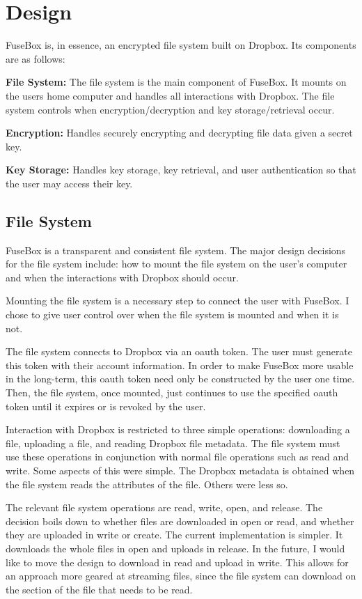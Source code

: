 \documentclass[11pt,twocolumn,letterpaper]{article}
\newcommand{\appname}{FuseBox }
\newcommand{\appnameWOspace}{FuseBox}
\begin{document}
\section{Design}
\label{sec:design}
\appname is, in essence, an encrypted file system built on
Dropbox. Its components are as follows:
\par {\bf File System:} The file system is the main component of 
\appnameWOspace. It mounts on the users home computer and handles 
all interactions with Dropbox. The file system controls when
encryption/decryption and key storage/retrieval occur.   
\par {\bf Encryption:} Handles securely encrypting and decrypting file data
given a secret key. 
\par {\bf Key Storage:} Handles key storage, key retrieval, and user
authentication so that the user may access their key. 

\subsection{File System}
\label{sec:fs}
\appname is a transparent and consistent file system. The major design
decisions for the file system include: how to mount the file system on
the user's computer and when the interactions with Dropbox should
occur. 
\par Mounting the file system is a necessary step to connect the user
with \appnameWOspace. I chose to give user control over when the file
system is mounted and when it is not.  
\par The file system connects to Dropbox via an oauth token. The user must
generate this token with their account information. In order to make
\appname more usable in the long-term, this oauth token need only be
constructed by the user one time. Then, the file system, once mounted,
just continues to use the specified oauth token until it expires or is
revoked by the user. 
\par Interaction with Dropbox is restricted to three simple
operations: downloading a file, uploading a file, and reading Dropbox
file metadata. The file system must use these operations in
conjunction with normal file operations such as read and write. Some
aspects of this were simple. The Dropbox metadata is obtained when the
file system reads the attributes of the file. Others were less so.
\par The relevant file system operations are read, write, open, and
release. The decision boils down to whether files are downloaded in
open or read, and whether they are uploaded in write or create. The
current implementation is simpler. It downloads the whole files in open and uploads in
release. In the future, I would like to move the design to download in
read and upload in write. This allows for an approach more geared at
streaming files, since the file system can download on the section of the file that
needs to be read. 
\end{document}
